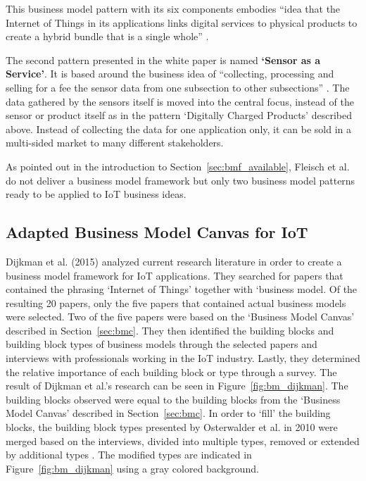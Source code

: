 		This business model pattern with its six components embodies ``idea that the Internet of Things in its applications links digital services to physical products to create a hybrid bundle that is a single whole'' \cite[p.~11]{fleisch}. 

		The second pattern presented in the white paper is named \textbf{`Sensor as a Service'}. It is based around the business idea of ``collecting, processing and selling for a fee the sensor data from one subsection to other subsections'' \cite[p.~11]{fleisch}. The data gathered by the sensors itself is moved into the central focus, instead of the sensor or product itself as in the pattern `Digitally Charged Products' described above. Instead of collecting the data for one application only, it can be sold in a multi-sided market to many different stakeholders.

		As pointed out in the introduction to Section~\ref{sec:bmf_available}, Fleisch et al. do not deliver a business model framework but only two business model patterns ready to be applied to IoT business ideas.

	\subsection{Adapted Business Model Canvas for IoT}
		Dijkman et al. (2015) \cite{dijkman} analyzed current research literature in order to create a business model framework for IoT applications. They searched for papers that contained the phrasing `Internet of Things' together with `business model. Of the resulting 20 papers, only the five papers that contained actual business models were selected. Two of the five papers were based on the `Business Model Canvas' described in Section~\ref{sec:bmc}. They then identified the building blocks and building block types of business models through the selected papers and interviews with professionals working in the IoT industry. Lastly, they determined the relative importance of each building block or type through a survey. The result of Dijkman et al.'s research can be seen in Figure~\ref{fig:bm_dijkman}. The building blocks observed were equal to the building blocks from the `Business Model Canvas' described in Section~\ref{sec:bmc}. In order to `fill' the building blocks, the building block types presented by Osterwalder et al. in 2010 were merged based on the interviews, divided into multiple types, removed or extended by additional types \cite{osterwalder2010} \cite{dijkman}. The modified types are indicated in Figure~\ref{fig:bm_dijkman} using a gray colored background.


